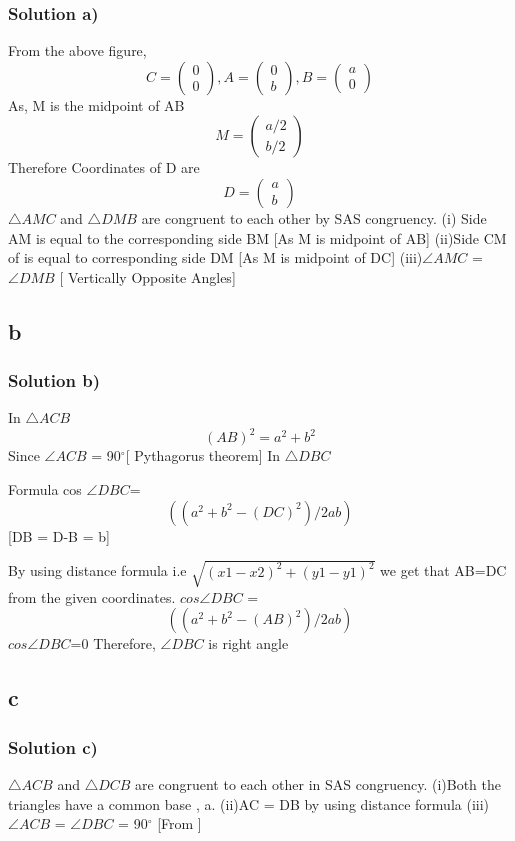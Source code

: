 \documentclass{beamer}
\begin{document}
\begin{frame}
\frametitle{Solution a)}
\label{a}
\small
From the above figure,
$$
C=
\begin{pmatrix}
0\\
0
\end{pmatrix}
,A=
\begin{pmatrix}
0\\
b
\end{pmatrix}
,B=
\begin{pmatrix}
a\\
0
\end{pmatrix}
$$
As, M is the midpoint of AB
$$
M=
\begin{pmatrix}
a/2 \\
b/2 
\end{pmatrix}
$$
Therefore Coordinates of D are
$$
D=
\begin{pmatrix}
a\\
b
\end{pmatrix}
$$
\newline
$\triangle AMC$ and $\triangle DMB$ are congruent to each other by SAS congruency.
\newline
(i) Side AM  is equal to the corresponding side BM  [As M is midpoint of AB]
\newline
(ii)Side CM of is equal to corresponding side DM [As M is midpoint of DC]
\newline
(iii)$\angle AMC$ = $\angle DMB$ [ Vertically Opposite Angles]
\end{frame}
\subsection{b}
\begin{frame}
\frametitle{Solution b)}
\label{b}
\small
In $\triangle ACB$ \[(AB)^2=a^2+b^2\]
Since $\angle ACB$ = 90$^{\circ}$[ Pythagorus theorem]
\newline
In $\triangle DBC$ 
\begin{block}{Formula}
cos $\angle DBC$= \[((a^2+b^2-(DC)^2)/2ab)\] [DB = D-B = b]
\end{block}
By using distance formula i.e $\sqrt{(x1-x2)^2+(y1-y1)^2}$ we get that AB=DC from the given coordinates.
\newline
$cos\angle DBC$ =\[((a^2+b^2-(AB)^2)/2ab)\]
$cos\angle DBC$=0
\newline
Therefore, $\angle DBC$ is right angle
\end{frame}
\subsection{c}
\begin{frame}
\frametitle{Solution c)}
\label{c}
$\triangle ACB$ and $\triangle DCB$ are congruent to each other in SAS congruency.
(i)Both the triangles have a common base , a.
\newline
(ii)AC = DB by using distance formula
\newline
(iii)$\angle ACB$ = $\angle DBC$ = 90$^{\circ}$ [From \hyperlink{b}{}]

\end{frame}
\end{document}
